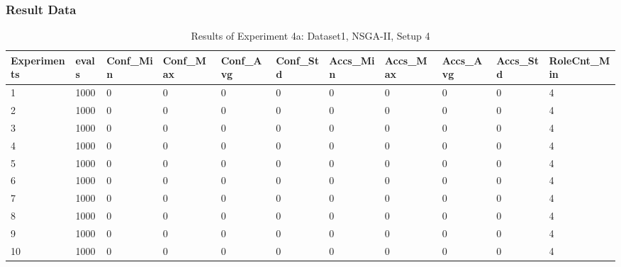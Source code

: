 		\subsubsection{Result Data}
		\label{sec:A_Exp4a_Data}
		\begin{table}[H]
			\caption{Results of Experiment 4a: Dataset1, NSGA-II, Setup 4}
			\label{tab:A_Exp4a_Data}
			\begin{adjustbox}{max width=380pt,keepaspectratio,angle=90}
				\begin{tabular}{|l|l|l|l|l|l|l|l|l|l|l|}
					\hline
					\rowcolor[HTML]{EFEFEF} 
					Experiments & evals & Conf\_Min & Conf\_Max & Conf\_Avg & Conf\_Std & Accs\_Min & Accs\_Max & Accs\_Avg & Accs\_Std & RoleCnt\_Min \\ \hline
					1           & 1000  & 0         & 0         & 0         & 0         & 0         & 0         & 0         & 0         & 4            \\ \hline
					2           & 1000  & 0         & 0         & 0         & 0         & 0         & 0         & 0         & 0         & 4            \\ \hline
					3           & 1000  & 0         & 0         & 0         & 0         & 0         & 0         & 0         & 0         & 4            \\ \hline
					4           & 1000  & 0         & 0         & 0         & 0         & 0         & 0         & 0         & 0         & 4            \\ \hline
					5           & 1000  & 0         & 0         & 0         & 0         & 0         & 0         & 0         & 0         & 4            \\ \hline
					6           & 1000  & 0         & 0         & 0         & 0         & 0         & 0         & 0         & 0         & 4            \\ \hline
					7           & 1000  & 0         & 0         & 0         & 0         & 0         & 0         & 0         & 0         & 4            \\ \hline
					8           & 1000  & 0         & 0         & 0         & 0         & 0         & 0         & 0         & 0         & 4            \\ \hline
					9           & 1000  & 0         & 0         & 0         & 0         & 0         & 0         & 0         & 0         & 4            \\ \hline
					10          & 1000  & 0         & 0         & 0         & 0         & 0         & 0         & 0         & 0         & 4            \\ \hline

\end{tabular}
\end{adjustbox}
\end{table}
